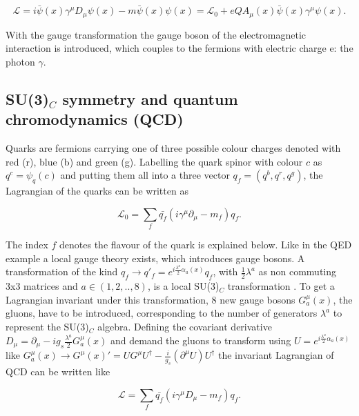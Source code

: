 \begin{equation}
	\label{eq:eq_1_2}
	\mathcal{L} = i\bar{\psi}(x)\gamma^{\mu}D_{\mu}\psi(x) - m\bar{\psi}(x)\psi(x) = \mathcal{L}_{0} + eQA_{\mu}(x)\bar{\psi}(x)\gamma^{\mu}\psi(x).
\end{equation}

With the gauge transformation the gauge boson of the electromagnetic interaction is introduced, which couples to the fermions with electric charge e: the photon $\gamma$.


\subsection{SU(3)${_C}$ symmetry and quantum chromodynamics (\gls{QCD})}
\label{sec:section_1_1_2}

Quarks are fermions carrying one of three possible colour charges denoted with red (r), blue (b) and green (g). Labelling the quark spinor with colour $c$ as $q^{c} = \psi_{q}(c)$ and putting them all into a three vector $q_{f} = (q^{b}, q^{r}, q^{g})$, the Lagrangian of the quarks can be written as

\begin{equation}
	\label{eq:eq_1_3}
	\mathcal{L}_{0} = \sum_{f} \bar{q_{f}}(i\gamma^{\mu}\partial_{\mu} - m_{f})q_{f}.
\end{equation}

The index $f$ denotes the flavour of the quark is explained below. Like in the \gls{QED} example a local gauge theory exists, which introduces gauge bosons. A transformation of the kind $q_{f} \rightarrow q'_{f} = e^{i\frac{\lambda^{a}}{2}\alpha_{a}(x)} q_{f}$, with $\frac{1}{2} \lambda^{a}$ as non commuting 3x3 matrices and $a \in (1, 2, .., 8)$, is a local SU(3)$_{C}$ transformation \cite{QCD}. To get a Lagrangian invariant under this transformation, 8 new gauge bosons $G^{\mu}_{a}(x)$, the gluons, have to be introduced, corresponding to the number of generators $\lambda^{a}$ to represent the SU(3)$_{C}$ algebra. Defining the covariant derivative $D_{\mu} = \partial_{\mu}-ig_{s}\frac{\lambda^{a}}{2}G^{\mu}_{a}(x)$ and demand the gluons to transform using $U = e^{i\frac{\lambda^{a}}{2}\alpha_{a}(x)}$ like $G^{\mu}_{a}(x) \rightarrow G^{\mu}(x)' = UG^{\mu}U^{\dagger} - \frac{i}{g_s}(\partial^{\mu}U)U^{\dagger}$ the invariant Lagrangian of \gls{QCD} can be written like 

\begin{equation}
	\label{eq:eq_1_4}
	\mathcal{L} = \sum_{f} \bar{q_{f}}(i\gamma^{\mu}D_{\mu} - m_{f})q_{f}.
\end{equation}

